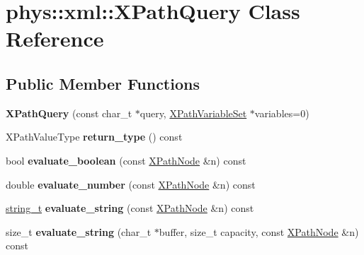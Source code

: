 \hypertarget{classphys_1_1xml_1_1XPathQuery}{
\section{phys::xml::XPathQuery Class Reference}
\label{de/d52/classphys_1_1xml_1_1XPathQuery}
}
\subsection*{Public Member Functions}
\begin{DoxyCompactItemize}
\item 
\hypertarget{classphys_1_1xml_1_1XPathQuery_a1a63135370ef4999f3dd27540c9009a2}{
{\bfseries XPathQuery} (const char\_\-t $\ast$query, \hyperlink{classphys_1_1xml_1_1XPathVariableSet}{XPathVariableSet} $\ast$variables=0)}
\label{de/d52/classphys_1_1xml_1_1XPathQuery_a1a63135370ef4999f3dd27540c9009a2}

\item 
\hypertarget{classphys_1_1xml_1_1XPathQuery_a707742d4a50e3aa02df27373f2bf6360}{
XPathValueType {\bfseries return\_\-type} () const }
\label{de/d52/classphys_1_1xml_1_1XPathQuery_a707742d4a50e3aa02df27373f2bf6360}

\item 
\hypertarget{classphys_1_1xml_1_1XPathQuery_a045c0650a983ceb24772975f0a9176d3}{
bool {\bfseries evaluate\_\-boolean} (const \hyperlink{classphys_1_1xml_1_1XPathNode}{XPathNode} \&n) const }
\label{de/d52/classphys_1_1xml_1_1XPathQuery_a045c0650a983ceb24772975f0a9176d3}

\item 
\hypertarget{classphys_1_1xml_1_1XPathQuery_a276e1854c0644c882e384ad433bb9ec3}{
double {\bfseries evaluate\_\-number} (const \hyperlink{classphys_1_1xml_1_1XPathNode}{XPathNode} \&n) const }
\label{de/d52/classphys_1_1xml_1_1XPathQuery_a276e1854c0644c882e384ad433bb9ec3}

\item 
\hypertarget{classphys_1_1xml_1_1XPathQuery_ad3869adac741a602b267a3006b0d3e40}{
\hyperlink{namespacephys_1_1xml_a6db751f2b35502e04c123bb70daa0d20}{string\_\-t} {\bfseries evaluate\_\-string} (const \hyperlink{classphys_1_1xml_1_1XPathNode}{XPathNode} \&n) const }
\label{de/d52/classphys_1_1xml_1_1XPathQuery_ad3869adac741a602b267a3006b0d3e40}

\item 
\hypertarget{classphys_1_1xml_1_1XPathQuery_a51840dda4891aeac6ec47569dede3e9a}{
size\_\-t {\bfseries evaluate\_\-string} (char\_\-t $\ast$buffer, size\_\-t capacity, const \hyperlink{classphys_1_1xml_1_1XPathNode}{XPathNode} \&n) const }
\label{de/d52/classphys_1_1xml_1_1XPathQuery_a51840dda4891aeac6ec47569dede3e9a}


\end{DoxyCompactItemize}

